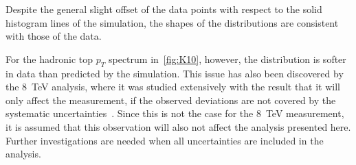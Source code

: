  Despite the general slight offset of the data points with respect to the solid histogram lines of the simulation, the shapes of the distributions are consistent with those of the data. 
 
 For the hadronic top $p_T$ spectrum in~\cref{fig:K10}, however, the distribution is softer in data than predicted by the simulation. This issue has also been discovered by the 8~TeV analysis, where it was studied extensively with the result that it will only affect the measurement, if the observed deviations are not covered by the systematic uncertainties~\cite{ATLAS-CONF-2017-071}. Since this is not the case for the 8~TeV measurement, it is assumed that this observation will also not affect the analysis presented here. Further investigations are needed when all  uncertainties are included in the analysis. 




 











